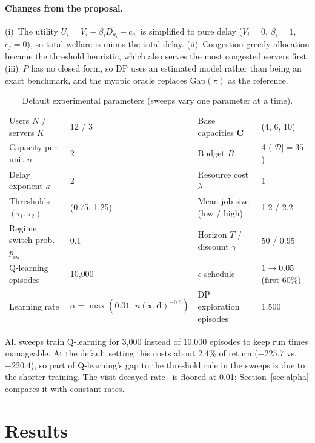 \documentclass{article}
\begin{document}
\paragraph{Changes from the proposal.} (i)~The utility
$U_i=V_i-\beta_iD_{a_i}-c_{a_i}$ is simplified to pure delay ($V_i=0$, $\beta_i=1$,
$c_j=0$), so total welfare is minus the total delay. (ii)~Congestion-greedy allocation
became the threshold heuristic, which also serves the most congested servers first.
(iii)~$P$ has no closed form, so DP uses an estimated model rather than being an exact
benchmark, and the myopic oracle replaces $\mathrm{Gap}(\pi)$ as the reference.

\begin{table}[t]
\centering\small
\begin{tabular}{@{}ll@{\hspace{2em}}ll@{}}
\toprule
Users $N$ / servers $K$ & 12 / 3 & Base capacities $\bm C$ & (4, 6, 10)\\
Capacity per unit $\eta$ & 2 & Budget $B$ & 4 ($|\mathcal D|=35$)\\
Delay exponent $\kappa$ & 2 & Resource cost $\lambda$ & 1\\
Thresholds $(\tau_1,\tau_2)$ & (0.75, 1.25) & Mean job size (low / high) & 1.2 / 2.2\\
Regime switch prob.\ $p_{\text{sw}}$ & 0.1 & Horizon $T$ / discount $\gamma$ & 50 / 0.95\\
Q-learning episodes & 10{,}000 & $\epsilon$ schedule & $1\to0.05$ (first 60\%)\\
Learning rate & $\alpha=\max(0.01,\,n(\bm x,\bm d)^{-0.6})$ & DP exploration episodes & 1{,}500\\
\bottomrule
\end{tabular}
\caption{Default experimental parameters (sweeps vary one parameter at a time).}
\label{tab:setup}
\end{table}
All sweeps train Q-learning for 3{,}000 instead of 10{,}000 episodes to keep run times
manageable. At the default setting this costs about 2.4\% of return ($-225.7$ vs.\
$-220.4$), so part of Q-learning's gap to the threshold rule in the sweeps is due to the
shorter training. The visit-decayed rate~\cite{evendar2003} is floored at 0.01;
Section~\ref{sec:alpha} compares it with constant rates.

\section{Results}\label{sec:results}
\end{document}
